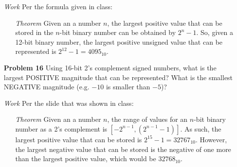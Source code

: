 \documentclass[12pt]{article}
\begin{document}
\begin{enumerate}
  \item[\textit{Work}] Per the formula given in class:
  \begin{enumerate}
    \item[\textit{Theorem}] Given an a number $n$, the largest positive value that can be stored in the $n$-bit binary number can be obtained by $2^n-1$. So, given a 12-bit binary number, the largest positive unsigned value that can be represented is $2^{12}-1=4095_{10}$.
  \end{enumerate}
\end{enumerate}


\begin{enumerate}
  \item[\textbf{Problem 16}] Using 16-bit 2’s complement signed numbers, what is the largest POSITIVE magnitude that can be represented?  What is the smallest NEGATIVE magnitude (e.g. $-10$ is smaller than $-5$)?
\end{enumerate}

\begin{enumerate}
  \item[\textit{Work}] Per the slide that was shown in class:
  \begin{enumerate}
    \item[\textit{Theorem}] Given an a number $n$, the range of values for an $n$-bit binary number as a 2's complement is $[-2^{n-1},(2^{n-1}-1)]$. As such, the largest positive value that can be stored is $2^{15}-1=32767_{10
    }$. However, the largest negative value that can be stored is the negative of one more than the largest positive value, which would be $32768_{10}$.
  \end{enumerate}
\end{enumerate}
\end{document}
